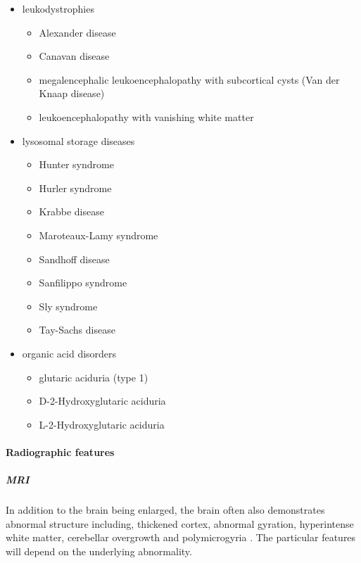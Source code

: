 \begin{itemize}
	\item
	leukodystrophies
	
	\begin{itemize}
		\item
		Alexander disease
		\item
		Canavan disease
		\item
		megalencephalic leukoencephalopathy with subcortical cysts (Van der Knaap disease)
		\item
		leukoencephalopathy with vanishing white matter
	\end{itemize}
	\item
	lysosomal storage diseases
	
	\begin{itemize}
		\item
		Hunter syndrome
		\item
		Hurler syndrome
		\item
		Krabbe disease
		\item
		Maroteaux-Lamy syndrome
		\item
		Sandhoff disease
		\item
		Sanfilippo syndrome
		\item
		Sly syndrome
		\item
		Tay-Sachs disease
	\end{itemize}
	\item
	organic acid disorders
	
	\begin{itemize}
		\item
		glutaric aciduria (type 1)
		\item
		D-2-Hydroxyglutaric aciduria
		\item
		L-2-Hydroxyglutaric aciduria
	\end{itemize}
\end{itemize}

\paragraph{Radiographic features}

\subparagraph{MRI}

In addition to the brain being enlarged, the brain often also demonstrates abnormal structure including, thickened cortex, abnormal gyration, hyperintense white matter, cerebellar overgrowth and polymicrogyria . The particular features will depend on the underlying abnormality.